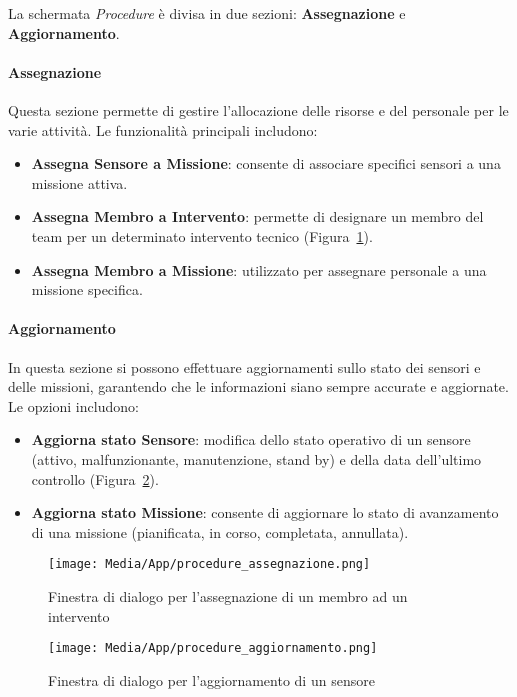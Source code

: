 \noindent
La schermata \textit{Procedure} è divisa in due sezioni: \textbf{Assegnazione} e \textbf{Aggiornamento}.

\paragraph{Assegnazione} Questa sezione permette di gestire l'allocazione delle risorse e del personale per le varie attività. Le funzionalità principali includono:
\begin{itemize}
    \item \textbf{Assegna Sensore a Missione}: consente di associare specifici sensori a una missione attiva.
    \item \textbf{Assegna Membro a Intervento}: permette di designare un membro del team per un determinato intervento tecnico (Figura~\ref{fig:procedura_assegnazione}).
    \item \textbf{Assegna Membro a Missione}: utilizzato per assegnare personale a una missione specifica.
\end{itemize}
\paragraph{Aggiornamento}
In questa sezione si possono effettuare aggiornamenti sullo stato dei sensori e delle missioni, garantendo che le informazioni siano sempre accurate e aggiornate. Le opzioni includono:
\begin{itemize}
    \item \textbf{Aggiorna stato Sensore}: modifica dello stato operativo di un sensore (attivo, malfunzionante, manutenzione, stand by) e della data dell'ultimo controllo (Figura~\ref{fig:procedura_aggiornamento}).
    \item \textbf{Aggiorna stato Missione}: consente di aggiornare lo stato di avanzamento di una missione (pianificata, in corso, completata, annullata).
\end{itemize}

\begin{figure}[ht!]
    \centering
    \texttt{[image: Media/App/procedure\_assegnazione.png]}
    \caption{Finestra di dialogo per l'assegnazione di un membro ad un intervento}
    \label{fig:procedura_assegnazione}
\end{figure}

\begin{figure}[ht!]
    \centering
    \texttt{[image: Media/App/procedure\_aggiornamento.png]}
    \caption{Finestra di dialogo per l'aggiornamento di un sensore}
    \label{fig:procedura_aggiornamento}
\end{figure}


